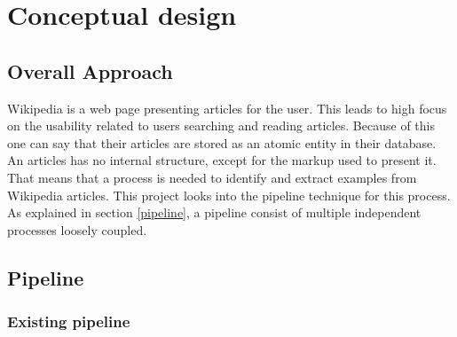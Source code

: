 
\chapter{Conceptual design}

\section{Overall Approach}

Wikipedia is a web page presenting articles for the user. This leads to high focus on the usability related to users searching and reading articles. Because of this one can say that their articles are stored as an atomic entity in their database. An articles has no internal structure, except for the markup used to present it. That means that a process is needed to identify and extract examples from Wikipedia articles. This 
project%
looks into the pipeline technique for this process. As explained in section \ref{pipeline}, a pipeline consist of multiple independent processes loosely coupled.\\



\section{Pipeline}


\subsection{Existing pipeline} \label{smila}

